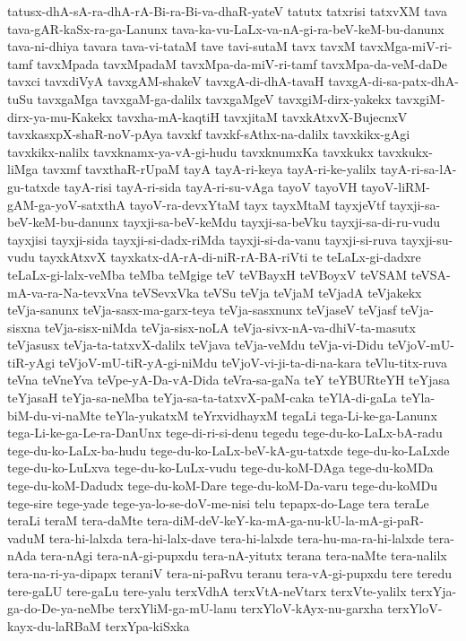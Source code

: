 {tatusx-dhA-sA-ra-dhA-rA-Bi-ra-Bi-va-dhaR-yateV
tatutx
tatxrisi
tatxvXM
tava
tava-gAR-kaSx-ra-ga-Lanunx
tava-ka-vu-LaLx-va-nA-gi-ra-beV-keM-bu-danunx
tava-ni-dhiya
tavara
tava-vi-tataM
tave
tavi-sutaM
tavx
tavxM
tavxMga-miV-ri-tamf
tavxMpada
tavxMpadaM
tavxMpa-da-miV-ri-tamf
tavxMpa-da-veM-daDe
tavxci
tavxdiVyA
tavxgAM-shakeV
tavxgA-di-dhA-tavaH
tavxgA-di-sa-patx-dhA-tuSu
tavxgaMga
tavxgaM-ga-dalilx
tavxgaMgeV
tavxgiM-dirx-yakekx
tavxgiM-dirx-ya-mu-Kakekx
tavxha-mA-kaqtiH
tavxjitaM
tavxkAtxvX-BujecnxV
tavxkasxpX-shaR-noV-pAya
tavxkf
tavxkf-sAthx-na-dalilx
tavxkikx-gAgi
tavxkikx-nalilx
tavxknamx-ya-vA-gi-hudu
tavxknumxKa
tavxkukx
tavxkukx-liMga
tavxmf
tavxthaR-rUpaM
tayA
tayA-ri-keya
tayA-ri-ke-yalilx
tayA-ri-sa-lA-gu-tatxde
tayA-risi
tayA-ri-sida
tayA-ri-su-vAga
tayoV
tayoVH
tayoV-liRM-gAM-ga-yoV-satxthA
tayoV-ra-devxYtaM
tayx
tayxMtaM
tayxjeVtf
tayxji-sa-beV-keM-bu-danunx
tayxji-sa-beV-keMdu
tayxji-sa-beVku
tayxji-sa-di-ru-vudu
tayxjisi
tayxji-sida
tayxji-si-dadx-riMda
tayxji-si-da-vanu
tayxji-si-ruva
tayxji-su-vudu
tayxkAtxvX
tayxkatx-dA-rA-di-niR-rA-BA-riVti
te
teLaLx-gi-dadxre
teLaLx-gi-lalx-veMba
teMba
teMgige
teV
teVBayxH
teVBoyxV
teVSAM
teVSA-mA-va-ra-Na-tevxVna
teVSevxVka
teVSu
teVja
teVjaM
teVjadA
teVjakekx
teVja-sanunx
teVja-sasx-ma-garx-teya
teVja-sasxnunx
teVjaseV
teVjasf
teVja-sisxna
teVja-sisx-niMda
teVja-sisx-noLA
teVja-sivx-nA-va-dhiV-ta-masutx
teVjasusx
teVja-ta-tatxvX-dalilx
teVjava
teVja-veMdu
teVja-vi-Didu
teVjoV-mU-tiR-yAgi
teVjoV-mU-tiR-yA-gi-niMdu
teVjoV-vi-ji-ta-di-na-kara
teVlu-titx-ruva
teVna
teVneYva
teVpe-yA-Da-vA-Dida
teVra-sa-gaNa
teY
teYBURteYH
teYjasa
teYjasaH
teYja-sa-neMba
teYja-sa-ta-tatxvX-paM-caka
teYlA-di-gaLa
teYla-biM-du-vi-naMte
teYla-yukatxM
teYrxvidhayxM
tegaLi
tega-Li-ke-ga-Lanunx
tega-Li-ke-ga-Le-ra-DanUnx
tege-di-ri-si-denu
tegedu
tege-du-ko-LaLx-bA-radu
tege-du-ko-LaLx-ba-hudu
tege-du-ko-LaLx-beV-kA-gu-tatxde
tege-du-ko-LaLxde
tege-du-ko-LuLxva
tege-du-ko-LuLx-vudu
tege-du-koM-DAga
tege-du-koMDa
tege-du-koM-Dadudx
tege-du-koM-Dare
tege-du-koM-Da-varu
tege-du-koMDu
tege-sire
tege-yade
tege-ya-lo-se-doV-me-nisi
telu
tepapx-do-Lage
tera
teraLe
teraLi
teraM
tera-daMte
tera-diM-deV-keY-ka-mA-ga-nu-kU-la-mA-gi-paR-vaduM
tera-hi-lalxda
tera-hi-lalx-dave
tera-hi-lalxde
tera-hu-ma-ra-hi-lalxde
tera-nAda
tera-nAgi
tera-nA-gi-pupxdu
tera-nA-yitutx
terana
tera-naMte
tera-nalilx
tera-na-ri-ya-dipapx
teraniV
tera-ni-paRvu
teranu
tera-vA-gi-pupxdu
tere
teredu
tere-gaLU
tere-gaLu
tere-yalu
terxVdhA
terxVtA-neVtarx
terxVte-yalilx
terxYja-ga-do-De-ya-neMbe
terxYliM-ga-mU-lanu
terxYloV-kAyx-nu-garxha
terxYloV-kayx-du-laRBaM
terxYpa-kiSxka
}
